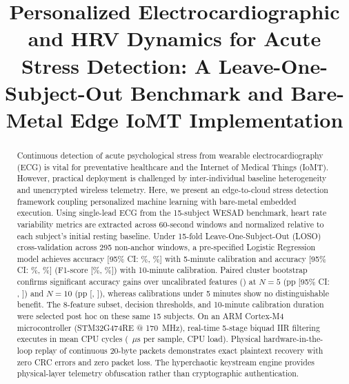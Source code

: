 \documentclass[conference]{IEEEtran}
\begin{document}
\title{Personalized Electrocardiographic and HRV Dynamics for Acute Stress Detection: A Leave-One-Subject-Out Benchmark and Bare-Metal Edge IoMT Implementation}

\author{
}

\maketitle

\begin{abstract}
Continuous detection of acute psychological stress from wearable electrocardiography (ECG) is vital for preventative healthcare and the Internet of Medical Things (IoMT). However, practical deployment is challenged by inter-individual baseline heterogeneity and unencrypted wireless telemetry. Here, we present an edge-to-cloud stress detection framework coupling personalized machine learning with bare-metal embedded execution. Using single-lead ECG from the 15-subject WESAD benchmark, heart rate variability metrics are extracted across 60-second windows and normalized relative to each subject's initial resting baseline. Under 15-fold Leave-One-Subject-Out (LOSO) cross-validation across 295 non-anchor windows, a pre-specified Logistic Regression model achieves \valNfiveAccPct accuracy [95\% CI: \valNfiveAccCILow\%, \valNfiveAccCIHigh\%] with 5-minute calibration and \valNtenAccPct accuracy [95\% CI: \valNtenAccCILow\%, \valNtenAccCIHigh\%] (\valNtenFOnePct F1-score [\valNtenFOneCILow\%, \valNtenFOneCIHigh\%]) with 10-minute calibration. Paired cluster bootstrap confirms significant accuracy gains over uncalibrated features (\valControlNoCalibAccPct) at $N=5$ (\valPairedGainNfive pp [95\% CI: \valPairedGainNfiveCILow, \valPairedGainNfiveCIHigh]) and $N=10$ (\valPairedGainNten pp [\valPairedGainNtenCILow, \valPairedGainNtenCIHigh]), whereas calibrations under 5 minutes show no distinguishable benefit. The 8-feature subset, decision thresholds, and 10-minute calibration duration were selected post hoc on these same 15 subjects. On an ARM Cortex-M4 microcontroller (STM32G474RE @ 170~MHz), real-time 5-stage biquad IIR filtering executes in \valBiquadMeanCycles mean CPU cycles (\valBiquadMeanUs~$\mu\text{s}$ per sample, \valBiquadCpuLoad CPU load). Physical hardware-in-the-loop replay of \valHilPackets continuous 20-byte packets demonstrates exact plaintext recovery with zero CRC errors and zero packet loss. The hyperchaotic keystream engine provides physical-layer telemetry obfuscation rather than cryptographic authentication.
\end{abstract}
\end{document}
